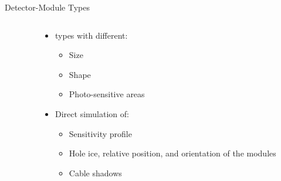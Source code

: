 
\begin{frame}[fragile]{Detector-Module Types}

  \begin{columns}
    \begin{column}{0.7\textwidth}
      \begin{overlayarea}{\textwidth}{\textheight}
        \vspace*{1cm}
      \end{overlayarea}
    \end{column}
    \begin{column}{0.3\textwidth}
      \begin{itemize}
        \item {} types with different:
        \begin{itemize}
          \item Size
          \item Shape
          \item Photo-sensitive areas
        \end{itemize}
        \item Direct simulation of:
        \begin{itemize}
          \item Sensitivity profile
          \item Hole ice, relative position, and orientation of the modules
          \item Cable shadows
        \end{itemize}
      \end{itemize}

      \vspace{2cm}

    \end{column}
  \end{columns}

\end{frame}